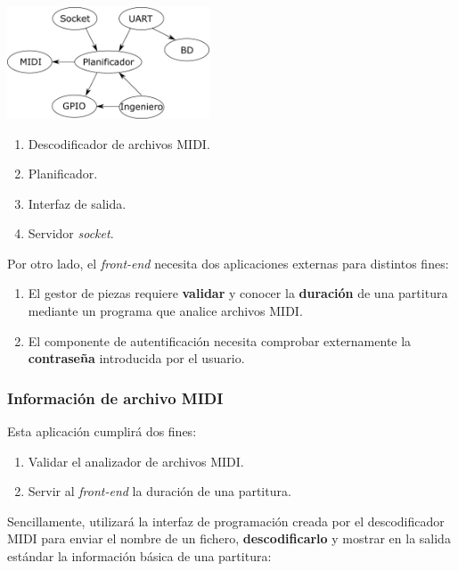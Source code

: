 \documentclass[10pt,a4paper]{article}
\begin{document}
	\begin{multicols}{2}
		\noindent
		\begin{center}
			\includegraphics[width=0.45\textwidth]{images/daemon} 
		\end{center}
		\columnbreak
		\begin{enumerate}
			\item Descodificador de archivos MIDI.
			\item Planificador.
			\item Interfaz de salida.
			\item Servidor \textit{socket}.
		\end{enumerate}
	\end{multicols}
	
	Por otro lado, el \textit{front-end} necesita dos aplicaciones externas para distintos fines:
	
	\begin{enumerate}
		\item El gestor de piezas requiere \textbf{validar} y conocer la \textbf{duración} de una partitura mediante un programa que analice archivos MIDI.
		
		\item El componente de autentificación necesita comprobar externamente la \textbf{contraseña} introducida por el usuario.
	\end{enumerate}
	
	\subsubsection*{Información de archivo MIDI}
	
	Esta aplicación cumplirá dos fines:
	
	\begin{enumerate}
		\item Validar el analizador de archivos MIDI.
		\item Servir al \textit{front-end} la duración de una partitura.
	\end{enumerate}
	
	Sencillamente, utilizará la interfaz de programación creada por el descodificador MIDI para enviar el nombre de un fichero, \textbf{descodificarlo} y mostrar en la salida estándar la información básica de una partitura:
	
\end{document}
